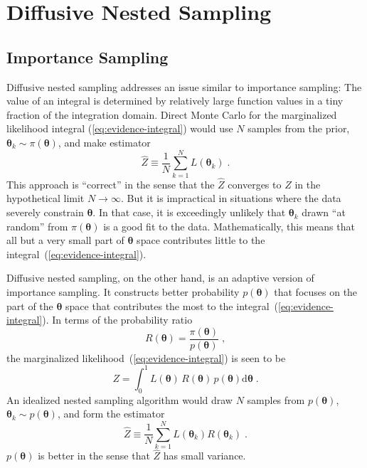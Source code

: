 \documentclass[letterpaper, preprint]{aastex}
\newcounter{address}
\newcommand{\bth} {\boldsymbol \theta}
\newcommand{\md}{\mathrm{d}}
\begin{document}
\section{Diffusive Nested Sampling}
\label{sec:dns}

\subsection{Importance Sampling}

Diffusive nested sampling addresses an issue similar to importance sampling: 
The value of an integral is determined by relatively large function values in a tiny fraction of 
the integration domain.
Direct Monte Carlo for the marginalized likelihood integral (\ref{eq:evidence-integral}) would 
use $N$ samples from the prior, $\bth_k\sim\pi(\bth)$, and make estimator
\begin{equation}
\widehat{Z} \equiv \frac{1}{N}\sum_{k=1}^N L(\bth_k)\;.
\end{equation}
This approach is ``correct'' in the sense that the $\widehat{Z}$ converges to $Z$ in the hypothetical limit $N\to\infty$. But it is impractical in situations where the data severely constrain $\bth$. In that case, it is exceedingly unlikely that $\bth_k$ drawn ``at random'' from $\pi(\bth)$ is a good fit to the data. Mathematically, this means that all but a very small part of $\bth$ space contributes little to the integral~(\ref{eq:evidence-integral}).

Diffusive nested sampling, on the other hand, is an adaptive version of importance sampling. 
It constructs better probability $p(\bth)$ that focuses on the part of the $\bth$ space that 
contributes the most to the integral~(\ref{eq:evidence-integral}). 
In terms of the probability ratio
\begin{equation}
R(\bth) = \frac{\pi(\bth)}{p(\bth)}\; ,
\end{equation}
the marginalized likelihood~(\ref{eq:evidence-integral}) is seen to be
\begin{equation}
Z=\int^1_0\! L(\bth)\,R(\bth)\,p(\bth)\md\bth \;.
\label{eq:evidence-integral-importance}
\end{equation}
An idealized nested sampling algorithm would draw $N$ samples from $p(\bth)$, $\bth_k \sim p(\bth)$, and form the estimator
\begin{equation}
\widehat{Z} \equiv \frac{1}{N}\sum_{k=1}^N L(\bth_k)R(\bth_k)\;.
\label{eq:evidence-sum-importance}
\end{equation}
$p(\bth)$ is better in the sense that $\widehat{Z}$ has small variance. 
\end{document}
